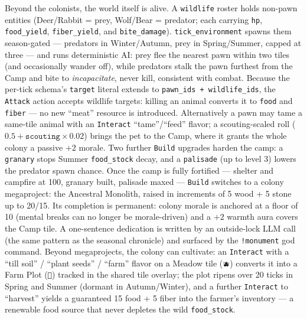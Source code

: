 \documentclass[10pt,a4paper]{article}
\begin{document}
Beyond the colonists, the world itself is alive. A \texttt{wildlife} roster holds non-pawn entities (Deer/Rabbit = prey, Wolf/Bear = predator; each carrying \texttt{hp}, \texttt{food\_yield}, \texttt{fiber\_yield}, and \texttt{bite\_damage}). \texttt{tick\_environment} spawns them season-gated --- predators in Winter/Autumn, prey in Spring/Summer, capped at three --- and runs deterministic AI: prey flee the nearest pawn within two tiles (and occasionally wander off), while predators stalk the pawn furthest from the Camp and bite to \emph{incapacitate}, never kill, consistent with combat. Because the per-tick schema's \texttt{target} literal extends to \texttt{pawn\_ids + wildlife\_ids}, the \texttt{Attack} action accepts wildlife targets: killing an animal converts it to \texttt{food} and \texttt{fiber} --- no new ``meat'' resource is introduced. Alternatively a pawn may tame a same-tile animal with an \texttt{Interact} ``tame''/``feed'' flavor; a scouting-scaled roll ($0.5 + \texttt{scouting} \times 0.02$) brings the pet to the Camp, where it grants the whole colony a passive $+2$ morale. Two further \texttt{Build} upgrades harden the camp: a \texttt{granary} stops Summer \texttt{food\_stock} decay, and a \texttt{palisade} (up to level 3) lowers the predator spawn chance. Once the camp is fully fortified --- shelter and campfire at 100, granary built, palisade maxed --- \texttt{Build} switches to a colony megaproject: the Ancestral Monolith, raised in increments of 5 wood + 5 stone up to 20/15. Its completion is permanent: colony morale is anchored at a floor of 10 (mental breaks can no longer be morale-driven) and a $+2$ warmth aura covers the Camp tile. A one-sentence dedication is written by an outside-lock LLM call (the same pattern as the seasonal chronicle) and surfaced by the \texttt{!monument} god command. Beyond megaprojects, the colony can cultivate: an \texttt{Interact} with a ``till soil'' / ``plant seeds'' / ``farm'' flavor on a Meadow tile (\texttt{🫐}) converts it into a Farm Plot (\texttt{🌾}) tracked in the shared tile overlay; the plot ripens over 20 ticks in Spring and Summer (dormant in Autumn/Winter), and a further \texttt{Interact} to ``harvest'' yields a guaranteed 15 food + 5 fiber into the farmer's inventory --- a renewable food source that never depletes the wild \texttt{food\_stock}.
\end{document}
